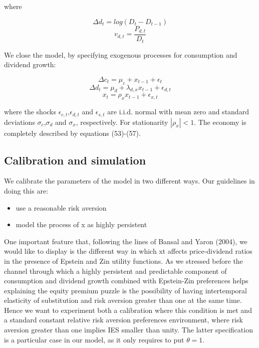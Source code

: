 \documentclass[a4paper,12pt]{scrartcl} %
\begin{document}
where

$$\Delta d_t=log(D_t-D_{t-1})$$
$$v_{d,t}=\frac{P_{d,t}}{D_t}$$

We close the model, by specifying exogenous processes for consumption and dividend growth:

\begin{equation}\label{55}
\Delta c_t=\mu_c+x_{t-1}+\epsilon_t
\end{equation}
\begin{equation}\label{56}
\Delta d_t=\mu_d+\lambda_{d,x}x_{t-1}+\epsilon_{d,t}
\end{equation}
\begin{equation}\label{57}
x_t=\rho_xx_{t-1}+\epsilon_{x,t}
\end{equation}

where the shocks $\epsilon_{c,t}$,$\epsilon_{d,t}$ and $\epsilon_{s,t}$ are i.i.d. normal with mean zero and standard deviations $\sigma_{c}$,$\sigma_{d}$ and $\sigma_{x}$, respectively. For stationarity $|\rho_x| < 1$. The economy is completely described by equations (53)-(57).

\subsection{Calibration and simulation}

We calibrate the parameters of the model in two different ways. Our guidelines in doing this are:

\begin{itemize}
\item use a reasonable risk aversion
\item model the process of x as highly persistent
\end{itemize}

One important feature that, following the lines of Bansal and Yaron (2004), we would like to display is the different way in which xt affects price-dividend ratios in the presence of Epstein and Zin utility functions. As we stressed before the channel through which a highly persistent and predictable component of consumption and dividend growth combined with Epstein-Zin preferences helps explaining the equity premium puzzle is the possibility of having intertemporal elasticity of substitution and risk aversion greater than one at the same time. Hence we want to experiment both a calibration where this condition is met and a standard constant relative risk aversion preferences environment, where risk aversion greater than one implies IES smaller than unity. The latter specification is a particular case in our model, as it only requires to put $\theta = 1$.
\end{document}
